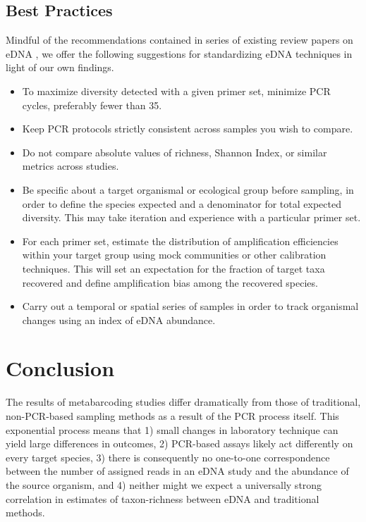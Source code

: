 \documentclass[fleqn,11pt,lineno]{wlscirep}
\begin{document}
\subsection*{Best Practices}

Mindful of the recommendations contained in series of existing review papers on eDNA \cite{Deagle2019391, Stat2017, Murray2015Frombenchtop}, we offer the following suggestions for standardizing eDNA techniques in light of our own findings. 

\begin{itemize}
	\item To maximize diversity detected with a given primer set, minimize PCR cycles, preferably fewer than 35. 
	\item Keep PCR protocols strictly consistent across samples you wish to compare.
	\item Do not compare absolute values of richness, Shannon Index, or similar metrics across studies. 
	\item Be specific about a target organismal or ecological group before sampling, in order to define the species expected and a denominator for total expected diversity. This may take iteration and experience with a particular primer set. 
	\item For each primer set, estimate the distribution of amplification efficiencies within your target group using mock communities or other calibration techniques. This will set an expectation for the fraction of target taxa recovered and define amplification bias among the recovered species. 
	\item Carry out a temporal or spatial series of samples in order to track organismal changes using an index of eDNA abundance.
\end{itemize}


\section{Conclusion}\label{Conclusion}

The results of metabarcoding studies differ dramatically from those of traditional, non-PCR-based sampling methods as a result of the PCR process itself. This exponential process means that 1) small changes in laboratory technique can yield large differences in outcomes, 2) PCR-based assays likely act differently on every target species, 3) there is consequently no one-to-one correspondence between the number of assigned reads in an eDNA study and the abundance of the source organism, and 4) neither might we expect a universally strong correlation in estimates of taxon-richness between eDNA and traditional methods. 
\end{document}
